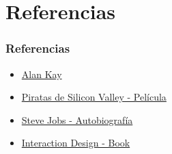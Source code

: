 \documentclass[11pt]{beamer}
\begin{document}
\section{Referencias}
\begin{frame}
\frametitle{Referencias}
\begin{itemize}
\item \href{https://es.wikipedia.org/wiki/Alan_Kay}{Alan Kay}
\item \href{https://es.wikipedia.org/wiki/Pirates_of_Silicon_Valley}{Piratas de Silicon Valley - Película}
\item \href{https://www.amazon.com/-/es/Walter-Isaacson/dp/1451648537}{Steve Jobs - Autobiografía}
\item \href{http://www.id-book.com/}{Interaction Design - Book}
\end{itemize}
\end{frame}
\end{document}
